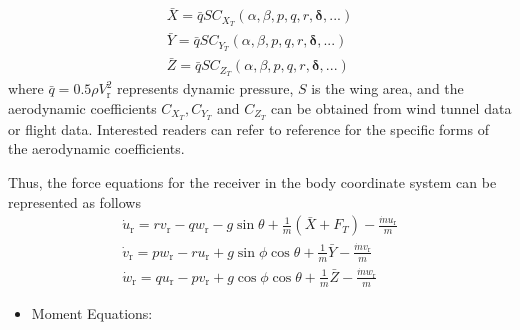 \begin{equation}\label{eq4.14}
\begin{array}{l}
\bar X = \bar qS{C_{{X_T}}}\left( {\alpha ,\beta ,p,q,r,\boldsymbol{\delta} ,...} \right)\\
\bar Y = \bar qS{C_{{Y_T}}}\left( {\alpha ,\beta ,p,q,r,\boldsymbol{\delta} ,...} \right)\\
\bar Z = \bar qS{C_{{Z_T}}}\left( {\alpha ,\beta ,p,q,r,\boldsymbol{\delta} ,...} \right)
\end{array}
\end{equation}
where $\bar q = 0.5\rho V_\mathrm{r}^2$ represents dynamic pressure, $S$ is the wing area, and the aerodynamic coefficients ${C_{{X_T}}},{C_{{Y_T}}}$ and ${C_{{Z_T}}}$ can be obtained from wind tunnel data or flight data. Interested readers can refer to reference \cite{nguyen_simulator_1979} for the specific forms of the aerodynamic coefficients.

Thus, the force equations for the receiver in the body coordinate system can be represented as follows
\begin{equation}\label{eq4.15}
\begin{array}{l}
{{\dot u}\mathrm{_r}} = r{v\mathrm{_r}} - q{w\mathrm{_r}} - g\sin \theta  + \frac{1}{m}\left( {\bar X + {F_T}} \right) - \frac{{\dot m{u\mathrm{_r}}}}{m}\\
{{\dot v}\mathrm{_r}} = p{w\mathrm{_r}} - r{u\mathrm{_r}} + g\sin \phi \cos \theta  + \frac{1}{m}\bar Y - \frac{{\dot m{v\mathrm{_r}}}}{m}\\
{{\dot w}\mathrm{_r}} = q{u\mathrm{_r}} - p{v\mathrm{_r}} + g\cos \phi \cos \theta  + \frac{1}{m}\bar Z - \frac{{\dot m{w\mathrm{_r}}}}{m}
\end{array}
\end{equation}

\begin{itemize}	
	\item  
	Moment Equations:
\end{itemize}

